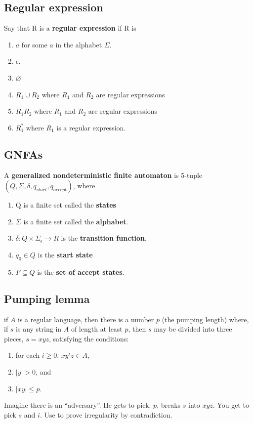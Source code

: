 \documentclass[a4paper]{article}
\begin{document}
\subsection{Regular expression} %
\label{sub:Regular expression}
Say that R is a {\bf regular expression} if R is
\begin{enumerate}
  \item $a$ for some $a$ in the alphabet $\Sigma$.
  \item $\epsilon$.
  \item $\varnothing$
  \item $R_1 \cup R_2$ where $R_1$ and $R_2$ are regular expressions
  \item $R_1 R_2$ where $R_1$ and $R_2$ are regular expressions
  \item $R_1^*$ where $R_1$ is a regular expression.
\end{enumerate}
\subsection{GNFAs} %
\label{sub:GNFAs}
A {\bf generalized nondeterministic finite automaton } is 5-tuple $(Q,\Sigma, \delta, q_{start}, q_{accept})$, where

\begin{enumerate}
  \item Q is a finite set called the {\bf states}
  \item $\Sigma$ is a finite set called the {\bf alphabet}.
  \item $\delta:Q \times \Sigma_{\epsilon} \rightarrow R$ is the {\bf transition function}.
  \item $q_0 \in Q$ is the {\bf start state}
  \item $F \subseteq Q$ is the {\bf set of accept states}.
\end{enumerate}
\subsection{Pumping lemma} %
\label{sub:Pumping lemma}
if $A$ is a regular language, then there is a number $p$ (the pumping length) where, if $s$ is any string in $A$ of length
at least $p$, then $s$ may be divided into three pieces, $s=xyz$, satisfying the conditions:
\begin{enumerate}
  \item for each $i\geq 0$, $xy^iz \in A$,
  \item $|y| > 0$, and
  \item $|xy| \leq p$.
\end{enumerate}
Imagine there is an ``adversary''. He gets to pick: $p$, breaks $s$ into $xyz$. You get to pick $s$ and $i$. Use to prove irregularity by contradiction.
\end{document}
